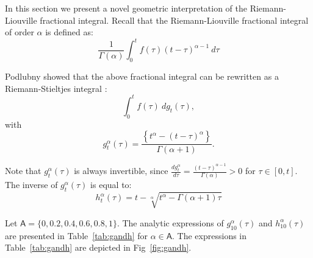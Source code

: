 \documentclass[twoside,reqno,11pt]{fcaa-var} %
\begin{document}
In this section we present a novel geometric interpretation of the Riemann-Liouville fractional integral. 
Recall that the Riemann-Liouville fractional integral of order $\alpha$ is defined as:
\begin{equation}
\label{eq:RL_frac_int}
\frac{1}{\Gamma(\alpha)}\int_{0}^{t}f(\tau)(t-\tau)^{\alpha-1}~d\tau
\end{equation}

\noindent
Podlubny showed that the above fractional integral can be rewritten as a Riemann-Stieltjes integral \cite{podlubny02}:
\begin{equation}
\label{eq:rs}
\int_0^{t} f(\tau)~dg_t(\tau),
\end{equation}
with 
\begin{equation}
\label{eq:g_rl}
g_t^{\alpha}(\tau) = \frac{\left \{t^{\alpha} - (t-\tau)^{\alpha} \right \}}{\Gamma(\alpha+1)}. 
\end{equation}

\noindent
Note that $g_t^{\alpha}(\tau)$ is always invertible, since $\frac{d g_t^{\alpha}}{d \tau} = \frac{(t-\tau)^{\alpha-1}}{\Gamma(\alpha)}>0$ for $\tau\in[0,t]$. The inverse 
of $g_t^{\alpha}(\tau)$ is equal to:
\begin{equation}
h_t^{\alpha}(\tau) = t - \sqrt[\alpha]{t^{\alpha} - \Gamma(\alpha+1)\tau}
\end{equation}

\noindent
Let $\mathsf{A} = \{0,0.2,0.4,0.6,0.8,1\}$. The analytic expressions of $g_{10}^{\alpha}(\tau)$ and $h_{10}^{\alpha}(\tau)$ are presented in Table~\ref{tab:gandh} for $\alpha\in\mathsf{A}$. 
The expressions in Table~\ref{tab:gandh} are depicted in Fig~\ref{fig:gandh}.
\end{document}
